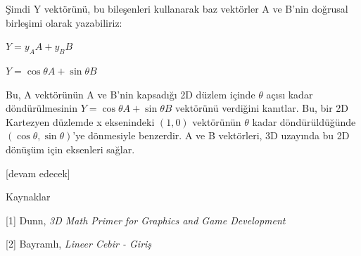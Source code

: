 \documentclass[12pt,fleqn]{article}\usepackage{../../common}
\begin{document}
Şimdi Y vektörünü, bu bileşenleri kullanarak baz vektörler A ve B'nin
doğrusal birleşimi olarak yazabiliriz:

$Y = y_A A + y_B B$

$Y = \cos \theta A + \sin \theta B$

Bu, A vektörünün A ve B'nin kapsadığı 2D düzlem içinde $\theta$ açısı
kadar döndürülmesinin $Y = \cos \theta A + \sin \theta B$ vektörünü
verdiğini kanıtlar. Bu, bir 2D Kartezyen düzlemde x eksenindeki $(1,
0)$ vektörünün $\theta$ kadar döndürüldüğünde $(\cos \theta, \sin
\theta)$'ye dönmesiyle benzerdir. A ve B vektörleri, 3D uzayında bu 2D
dönüşüm için eksenleri sağlar.

[devam edecek]

Kaynaklar

[1] Dunn, {\em 3D Math Primer for Graphics and Game Development}

[2] Bayramlı, {\em Lineer Cebir - Giriş}
\end{document}
